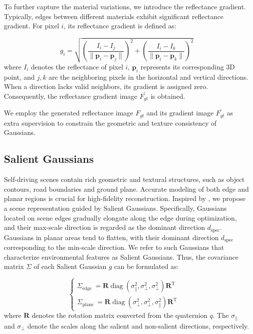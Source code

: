 \documentclass[letterpaper, 10 pt, conference]{ieeeconf}  %
\begin{document}
To further capture the material variations, we introduce the reflectance gradient. Typically, edges between different materials exhibit significant reflectance gradient. For pixel $i$, its reflectance gradient is defined as:

\begin{equation}
	\label{eq3}
g_i=\sqrt{\left(\frac{I_i-I_j}{\|\mathbf{p}_i-\mathbf{p}_j\|}\right)^2+\left(\frac{I_i-I_k}{\|\mathbf{p}_i-\mathbf{p}_k\|}\right)^2}
\end{equation}
where $I_i$ denotes the reflectance of pixel $i$, $\mathbf{p}_i$ represents its corresponding 3D point, and $j,k$ are the neighboring pixels in the horizontal and vertical directions. When a direction lacks valid neighbors, its gradient is assigned zero. Consequently, the reflectance gradient image $F_{gt}^{\prime}$ is obtained.

We employ the generated reflectance image $F_{gt}$ and its gradient image $F_{gt}^{\prime}$ as extra supervision to constrain the geometric and texture consistency of Gaussians.

\subsection{Salient Gaussians}

Self-driving scenes contain rich geometric and textural structures, such as object contours, road boundaries and ground plane. Accurate modeling of both edge and planar regions is crucial for high-fidelity reconstruction. Inspired by \cite{ref31}, we propose a scene representation guided by Salient Gaussians. Specifically, Gaussians located on scene edges gradually elongate along the edge during optimization, and their max-scale direction is regarded as the dominant direction $d_{\text{spec}}$. Gaussians in planar areas tend to flatten, with their dominant direction $d_{\text{spec}}$ corresponding to the min-scale direction. We refer to such Gaussians that characterize environmental features as Salient Gaussians. Thus, the covariance matrix $\Sigma$ of each Salient Gaussian $g$ can be formulated as: 

\begin{equation}
	\label{eq6}
\begin{cases}
\Sigma_{\text {edge }}=\mathbf{R} \operatorname{diag}\left(\sigma_{\|}^{2}, \sigma_{\perp}^{2}, \sigma_{\perp}^{2}\right) \mathbf{R}^{\text{T}} \\
\Sigma_{\text {plane }}=\mathbf{R} \operatorname{diag}\left(\sigma_{\perp}^{2}, \sigma_{\perp}^{2}, \sigma_{\|}^{2}\right) \mathbf{R}^{\text{T}} & 
\end{cases}
\end{equation}
where $\mathbf{R}$ denotes the rotation matrix converted from the quaternion $q$. The $\sigma_{\|}$ and $\sigma_{\perp}$ denote the scales along the salient and non-salient directions, respectively.
\end{document}
